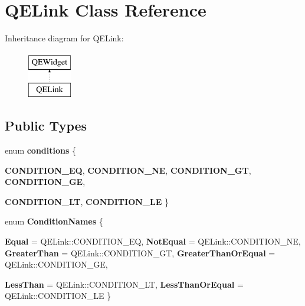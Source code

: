 \hypertarget{classQELink}{
\section{QELink Class Reference}
\label{classQELink}
}
Inheritance diagram for QELink:\begin{figure}[H]
\begin{center}
\leavevmode
\includegraphics[height=2.000000cm]{classQELink}
\end{center}
\end{figure}
\subsection*{Public Types}
\begin{DoxyCompactItemize}
\item 
enum {\bfseries conditions} \{ \par
{\bfseries CONDITION\_\-EQ}, 
{\bfseries CONDITION\_\-NE}, 
{\bfseries CONDITION\_\-GT}, 
{\bfseries CONDITION\_\-GE}, 
\par
{\bfseries CONDITION\_\-LT}, 
{\bfseries CONDITION\_\-LE}
 \}
\item 
enum {\bfseries ConditionNames} \{ \par
{\bfseries Equal} =  QELink::CONDITION\_\-EQ, 
{\bfseries NotEqual} =  QELink::CONDITION\_\-NE, 
{\bfseries GreaterThan} =  QELink::CONDITION\_\-GT, 
{\bfseries GreaterThanOrEqual} =  QELink::CONDITION\_\-GE, 
\par
{\bfseries LessThan} =  QELink::CONDITION\_\-LT, 
{\bfseries LessThanOrEqual} =  QELink::CONDITION\_\-LE
 \}
\end{DoxyCompactItemize}
